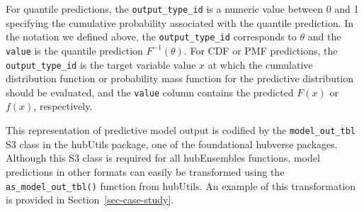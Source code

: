 \documentclass[
  letterpaper,
  DIV=11,
  numbers=noendperiod]{scrartcl}
\begin{document}
For quantile predictions, the \texttt{output\_type\_id} is a numeric
value between 0 and 1 specifying the cumulative probability associated
with the quantile prediction. In the notation we defined above, the
\texttt{output\_type\_id} corresponds to \(\theta\) and the
\texttt{value} is the quantile prediction \(F^{-1}(\theta)\). For CDF or
PMF predictions, the \texttt{output\_type\_id} is the target variable
value \(x\) at which the cumulative distribution function or probability
mass function for the predictive distribution should be evaluated, and
the \texttt{value} column contains the predicted \(F(x)\) or \(f(x)\),
respectively.

This representation of predictive model output is codified by the
\texttt{model\_out\_tbl} S3 class in the {hubUtils} package, one of the
foundational hubverse packages. Although this S3 class is required for
all {hubEnsembles} functions, model predictions in other formats can
easily be transformed using the \texttt{as\_model\_out\_tbl()} function
from {hubUtils}. An example of this transformation is provided in
Section~\ref{sec-case-study}.
\end{document}
